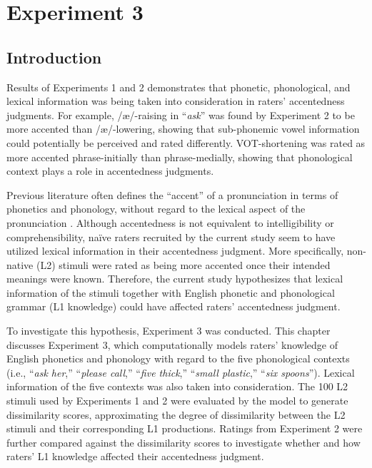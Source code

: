 \chapter{Experiment 3}
\label{ch:6}

\section{Introduction}

Results of Experiments 1 and 2 demonstrates that phonetic, phonological, and lexical information was being taken into consideration in raters' accentedness judgments. For example, /æ/-raising in “\textit{ask}” was found by Experiment 2 to be more accented than /æ/-lowering, showing that sub-phonemic vowel information could potentially be perceived and rated differently. VOT-shortening was rated as more accented phrase-initially than phrase-medially, showing that phonological context plays a role in accentedness judgments. 

Previous literature often defines the “accent” of a pronunciation in terms of phonetics and phonology, without regard to the lexical aspect of the pronunciation \citep{Wells_1982}. Although accentedness is not equivalent to intelligibility or comprehensibility, naïve raters recruited by the current study seem to have utilized lexical information in their accentedness judgment. More specifically, non-native (L2) stimuli were rated as being more accented once their intended meanings were known. Therefore, the current study hypothesizes that lexical information of the stimuli together with English phonetic and phonological grammar (L1 knowledge) could have affected raters' accentedness judgment.

To investigate this hypothesis, Experiment 3 was conducted. This chapter discusses Experiment 3, which computationally models raters' knowledge of English phonetics and phonology with regard to the five phonological contexts (i.e., “\textit{ask her},” “\textit{please call},” “\textit{five thick},” “\textit{small plastic},” “\textit{six spoons}”). Lexical information of the five contexts was also taken into consideration. The 100 L2 stimuli used by Experiments 1 and 2 were evaluated by the model to generate dissimilarity scores, approximating the degree of dissimilarity between the L2 stimuli and their corresponding L1 productions. Ratings from Experiment 2 were further compared against the dissimilarity scores to investigate whether and how raters' L1 knowledge affected their accentedness judgment.

